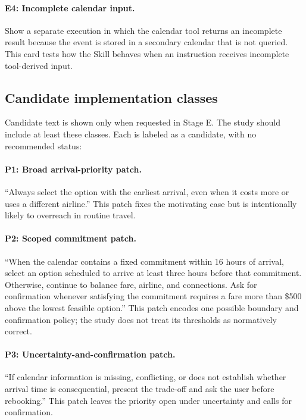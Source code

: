\paragraph{E4: Incomplete calendar input.}
Show a separate execution in which the calendar tool returns an incomplete
result because the event is stored in a secondary calendar that is not queried.
This card tests how the Skill behaves when an instruction receives incomplete
tool-derived input.

\subsection{Candidate implementation classes}
\label{app:candidate-patches}

Candidate text is shown only when requested in Stage E. The study should include
at least these classes. Each is labeled as a candidate, with no recommended
status:

\paragraph{P1: Broad arrival-priority patch.}
``Always select the option with the earliest arrival, even when it costs more or
uses a different airline.'' This patch fixes the motivating case but is
intentionally likely to overreach in routine travel.

\paragraph{P2: Scoped commitment patch.}
``When the calendar contains a fixed commitment within 16 hours of arrival,
select an option scheduled to arrive at least three hours before that commitment.
Otherwise, continue to balance fare, airline, and connections. Ask for
confirmation whenever satisfying the commitment requires a fare more than
\$500 above the lowest feasible option.'' This patch encodes one possible
boundary and confirmation policy; the study does not treat its thresholds as
normatively correct.

\paragraph{P3: Uncertainty-and-confirmation patch.}
``If calendar information is missing, conflicting, or does not establish
whether arrival time is consequential, present the trade-off and ask the user
before rebooking.'' This patch leaves the priority open under uncertainty and
calls for confirmation.

